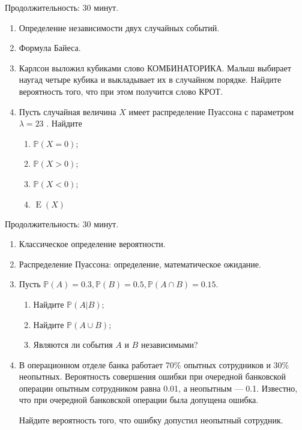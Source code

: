\documentclass[12pt]{article}
\DeclareMathOperator{\E}{E}
\def \P{\mathbb{P}}
\begin{document}
Продолжительность: 30 минут.



\begin{enumerate}
  \item Определение независимости двух случайных событий.
  \item Формула Байеса.
  \item  Карлсон выложил кубиками слово КОМБИНАТОРИКА. Малыш выбирает наугад четыре кубика и выкладывает их в случайном порядке.
  Найдите вероятность того, что при этом получится слово КРОТ.
  \item  Пусть случайная величина $X$ имеет распределение Пуассона с параметром $\lambda = 23$ .
  Найдите
  \begin{enumerate}
  	\item $\P(X = 0)$;
  	\item $\P(X > 0)$;
  	\item $\P(X < 0)$;
  	\item $\E(X)$
  \end{enumerate}
\end{enumerate}


\newpage
\setcounter{page}{2}
\mbox{}

\newpage
{}
\setcounter{page}{1}
Продолжительность: 30 минут.



\begin{enumerate}
  \item Классическое определение вероятности.
  \item Распределение Пуассона: определение, математическое ожидание.
  \item  Пусть $\P(A) = 0.3, \P(B) = 0.5, \P(A\cap B) = 0.15 $.
  \begin{enumerate}
  	\item  Найдите $\P(A|B)$;
  	\item  Найдите $\P(A\cup B)$;
  	\item  Являются ли события $A$ и $B$ независимыми?
  \end{enumerate}
  \item  В операционном отделе банка работает 70\% опытных сотрудников и 30\%
  неопытных. Вероятность совершения ошибки при очередной банковской операции
  опытным сотрудником равна 0.01, а неопытным — 0.1.
  Известно, что при очередной банковской операции была допущена ошибка.

  Найдите вероятность того, что ошибку допустил неопытный сотрудник.

\end{enumerate}
\end{document}
